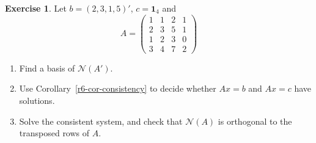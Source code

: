 \documentclass[12pt]{article}
\newcommand{\one}{\mathbf 1}
\theoremstyle{definition}
\newtheorem{exercise}{Exercise}
\begin{document}
\begin{exercise}\label{r6-dr-consistency}
Let \(b=(2,3,1,5)'\), \(c=\one_4\) and
\[
A=\begin{pmatrix}1&1&2&1\\2&3&5&1\\1&2&3&0\\3&4&7&2\end{pmatrix}
\]
\begin{enumerate}
\item Find a basis of \(\mathcal N(A')\).
\item Use Corollary~\ref{r6-cor-consistency} to decide whether \(Ax=b\) and \(Ax=c\) have solutions.
\item Solve the consistent system, and check that \(\mathcal N(A)\) is orthogonal to the transposed rows of \(A\).
\end{enumerate}
\end{exercise}
\end{document}
